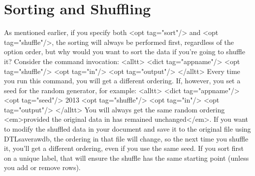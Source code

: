 \section{Sorting and Shuffling}\label{sortshuffle}

   As mentioned earlier, if you specify both <opt tag="sort"/> and
   <opt tag="shuffle"/>, the sorting will always be performed first, 
   regardless of the option order, but why would you want to sort the data
   if you're going to shuffle it? Consider the command invocation:
<alltt>
<dict tag="appname"/> <opt tag="shuffle"/> <opt tag="in"/>  <opt tag="output"/> 
</alltt>
   Every time you run this command, you will get a different ordering.
If, however, you set a seed for the random generator, for example:
<alltt>
<dict tag="appname"/> <opt tag="seed"/> 2013 <opt tag="shuffle"/> <opt tag="in"/>  <opt tag="output"/> 
</alltt>
   You will always get the same random ordering <em>provided the original 
   data in  has remained unchanged</em>. If you want to 
   modify the shuffled data in your document and save it to the original 
   file  using \gls{DTLsaverawdb}, the ordering in 
   that file will change, so the next time you shuffle it, you'll get 
   a different ordering, even if you use the same seed. If you sort
   first on a unique label, that will ensure the shuffle has the same 
   starting point (unless you add or remove rows).

